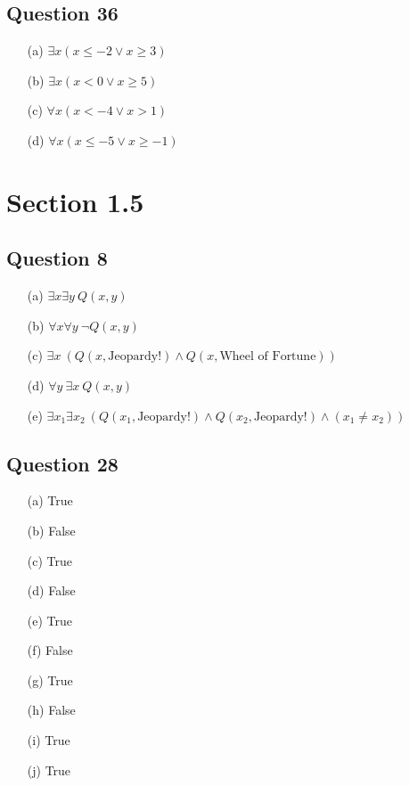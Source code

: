 \documentclass{article}
\begin{document}
\subsection*{Question 36}
\begin{itemize}
    \item[(a)] \(\exists x (x \leq -2 \lor x \geq 3)\)
    \item[(b)] \(\exists x (x < 0 \lor x \geq 5)\)
    \item[(c)] \(\forall x (x < -4 \lor x > 1)\)
    \item[(d)] \(\forall x (x \leq -5 \lor x \geq -1)\)
\end{itemize}


\section*{Section 1.5}

\subsection*{Question 8}

\begin{itemize}
    \item[(a)] \(\exists x \exists y \ Q(x, y)\)
    \item[(b)] \(\forall x \forall y \ \neg Q(x, y)\)
    \item[(c)] \(\exists x \ (Q(x, \text{Jeopardy!}) \land Q(x, \text{Wheel of Fortune}))\)
    \item[(d)] \(\forall y \ \exists x \ Q(x, y)\)
    \item[(e)] \(\exists x_1 \exists x_2 \ (Q(x_1, \text{Jeopardy!}) \land Q(x_2, \text{Jeopardy!}) \land (x_1 \neq x_2))\)
\end{itemize}

\subsection*{Question 28}
\begin{itemize}
    \item[(a)] True
    \item[(b)] False
    \item[(c)] True
    \item[(d)] False
    \item[(e)] True
    \item[(f)] False
    \item[(g)] True
    \item[(h)] False
    \item[(i)] True
    \item[(j)] True
\end{itemize}
\end{document}
